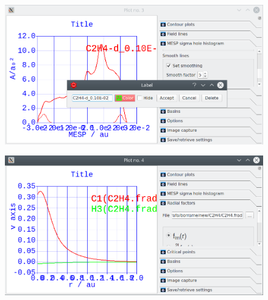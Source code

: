 \documentclass[a4paper,10pt]{article}
\begin{document}
\begin{minipage}{.5\linewidth}
\begin{figure}[H]
\caption{\label{fig:31}}
\begin{center}
\includegraphics[width=0.95\linewidth]{damqt_QS_fig31.png}
\end{center}
\end{figure} 
\end{minipage}
\begin{minipage}{.5\linewidth}
\begin{figure}[H]
\caption{\label{fig:32}}
\begin{center}
\includegraphics[width=0.95\linewidth]{damqt_QS_fig32.png}
\end{center}
\end{figure} 
\end{minipage}
\end{document}
